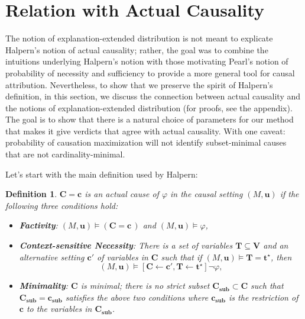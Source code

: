 \documentclass[twoside,11pt]{article}
\newtheorem{definition}{Definition}
\begin{document}
\section{Relation with Actual Causality} \label{sec:relation_with_ac}

The notion of explanation-extended distribution is not meant to explicate Halpern's notion of actual causality; rather, the goal was to combine the intuitions underlying Halpern's notion with those motivating Pearl's notion of probability of necessity and sufficiency to provide a more general tool for causal attribution. Nevertheless, to show that we preserve the spirit of Halpern's definition, in this section, we discuss the connection between actual causality and the notions of explanation-extended distribution (for proofs, see the appendix). The goal is to show that there is a natural choice of parameters for our method that makes it give verdicts that agree with actual causality. With one caveat: probability of causation maximization will not identify subset-minimal causes that are not cardinality-minimal.



Let's start with the main definition used by Halpern:

\begin{definition} \label{def:ac}
    \(\mathbf{C} = \mathbf{c}\) is an actual cause of \(\varphi\) in the causal setting \((M, \mathbf{u})\) if the following three conditions hold:
    \begin{itemize}
        \item \textbf{Factivity}: \((M, \mathbf{u}) \vDash (\mathbf{C} = \mathbf{c}\,)\) and \((M, \mathbf{u}) \vDash \varphi\),
        \item \textbf{Context-sensitive Necessity}: There is a set of variables \(\mathbf{T} \subseteq \mathbf{V}\) and an alternative setting \(\mathbf{c'}\) of variables in \(\mathbf{C}\) such that if \((M, \mathbf{u}) \vDash \mathbf{T} = \mathbf{t^\star}\), then
            \[(M, \mathbf{u}) \vDash [\mathbf{C} \leftarrow \mathbf{c'}, \mathbf{T} \leftarrow \mathbf{t^\star}] \neg \varphi,\]
        \item \textbf{Minimality}: \(\mathbf{C}\) is minimal; there is no strict subset \(\mathbf{C_{sub}} \subset \mathbf{C}\) such that \(\mathbf{C_{sub}} = \mathbf{c_{sub}}\) satisfies the above two conditions where $\mathbf{c_{sub}}$ is the restriction of \(\mathbf{c}\) to the variables in \(\mathbf{C_{sub}}\). 
    \end{itemize}
\end{definition}
\end{document}
